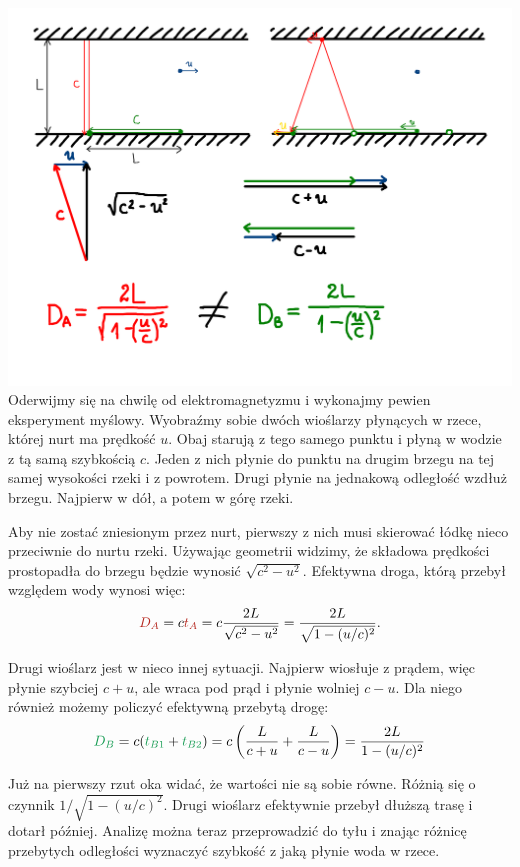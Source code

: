 \documentclass[10pt,twocolumn,fleqn,polish]{article}
\providecommand{\mathcolor}[2]{{\color{#1}#2}}
\begin{document}
\noindent\includegraphics[width=1\linewidth]{pages/STA-page11}
Oderwijmy się na chwilę od elektromagnetyzmu i wykonajmy pewien eksperyment myślowy.
Wyobraźmy sobie dwóch wioślarzy płynących w rzece, której nurt ma prędkość $u$.
Obaj starują z tego samego punktu i płyną w wodzie z tą samą szybkością $c$.
Jeden z nich płynie do punktu na drugim brzegu na tej samej wysokości rzeki i z powrotem.
Drugi płynie na jednakową odległość wzdłuż brzegu. Najpierw w dół, a potem w górę rzeki.

Aby nie zostać zniesionym przez nurt, pierwszy z nich musi skierować
łódkę nieco przeciwnie do nurtu rzeki. Używając geometrii widzimy,
że składowa prędkości prostopadła do brzegu będzie wynosić $\sqrt{c^2-u^2}$.
Efektywna droga, którą przebył względem wody wynosi więc:
\[
  \mathcolor{BrickRed}{D_A}
  = c \mathcolor{BrickRed}{t_A}
  = c \frac{2L}{\sqrt{c^2-u^2}}
  = \frac{2L}{\sqrt{1 - (u/c)^2}}.
\]

Drugi wioślarz jest w nieco innej sytuacji. Najpierw wiosłuje z prądem, więc
płynie szybciej $c + u$, ale wraca pod prąd i płynie wolniej $c - u$.
Dla niego również możemy policzyć efektywną przebytą drogę:
\[
  \mathcolor{ForestGreen}{D_B}
  = c (\mathcolor{ForestGreen}{t_{B1}} + \mathcolor{ForestGreen}{t_{B2}})
  = c \left(\frac{L}{c+u} + \frac{L}{c-u}\right)
  = \frac{2L}{1 - (u/c)^2}
\]

Już na pierwszy rzut oka widać, że wartości nie są sobie równe.
Różnią się o czynnik $1 / \sqrt{1-(u/c)^2}$. Drugi wioślarz efektywnie
przebył dłuższą trasę i dotarł później.
Analizę można teraz przeprowadzić do tyłu i znając różnicę przebytych odległości
wyznaczyć szybkość z jaką płynie woda w rzece.
\end{document}
